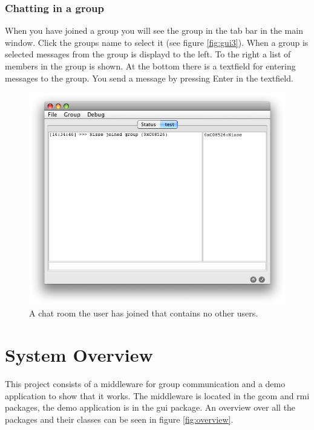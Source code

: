 \documentclass[english]{article}
\begin{document}
\subsubsection{Chatting in a group}
When you have joined a group you will see the group in the tab bar in the main window. Click the groups name to select it (see figure \vref{fig:gui3}). When a group is selected messages from the group is displayd to the left. To the right a list of members in the group is shown. At the bottom there is a textfield for entering messages to the group. You send a message by pressing Enter in the textfield.

\begin{figure}
\includegraphics[width=\textwidth]{gui3.png}
\caption{A chat room the user has joined that contains no other users.}
\label{fig:gui3}
\end{figure}


\section{System Overview}

This project consists of a middleware for group communication and a demo application to show that it works. The middleware is located in the gcom and rmi packages, the demo application is in the gui package. An overview over all the packages and their classes can be seen in figure \vref{fig:overview}.
\end{document}
